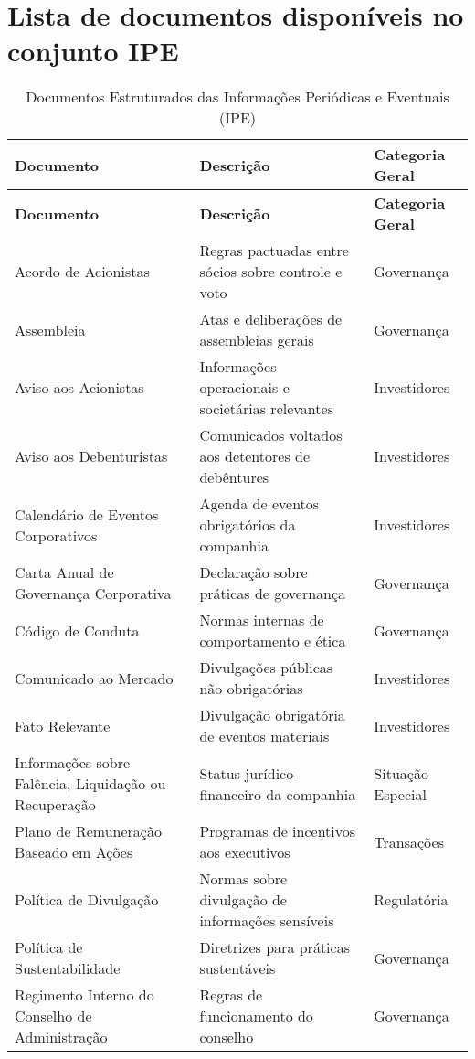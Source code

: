 \documentclass[recuosum=1.5cm]{iftex2024}
\begin{document}
\chapter{Lista de documentos disponíveis no conjunto IPE}\label{ap:ipe-visao-geral}
	
\begin{longtable}{p{6.5cm} p{5.5cm} p{2.5cm}}
	\caption{Documentos Estruturados das Informações Periódicas e Eventuais (IPE)}
	\label{tab:resumo_ipe} \\
	\toprule
	\textbf{Documento} & \textbf{Descrição} & \textbf{Categoria Geral} \\
	\midrule
	\endfirsthead
	\toprule
	\textbf{Documento} & \textbf{Descrição} & \textbf{Categoria Geral} \\
	\midrule
	\endhead
	
	Acordo de Acionistas & Regras pactuadas entre sócios sobre controle e voto & Governança \\
	Assembleia & Atas e deliberações de assembleias gerais & Governança \\
	Aviso aos Acionistas & Informações operacionais e societárias relevantes & Investidores \\
	Aviso aos Debenturistas & Comunicados voltados aos detentores de debêntures & Investidores \\
	Calendário de Eventos Corporativos & Agenda de eventos obrigatórios da companhia & Investidores \\
	Carta Anual de Governança Corporativa & Declaração sobre práticas de governança & Governança \\
	Código de Conduta & Normas internas de comportamento e ética & Governança  \\
	Comunicado ao Mercado & Divulgações públicas não obrigatórias & Investidores \\
	Fato Relevante & Divulgação obrigatória de eventos materiais & Investidores \\
	Informações sobre Falência, Liquidação ou Recuperação & Status jurídico-financeiro da companhia & Situação Especial \\
	Plano de Remuneração Baseado em Ações & Programas de incentivos aos executivos & Transações  \\
	Política de Divulgação & Normas sobre divulgação de informações sensíveis & Regulatória \\
	Política de Sustentabilidade & Diretrizes para práticas sustentáveis & Governança \\
	Regimento Interno do Conselho de Administração & Regras de funcionamento do conselho & Governança  \\

\end{longtable}
\end{document}

